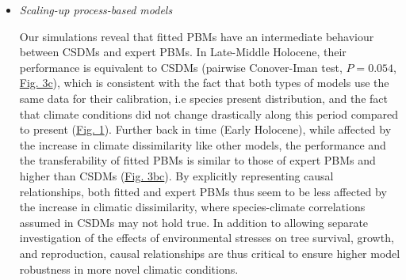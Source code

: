 \documentclass[pdflatex, sn-nature]{sn-jnl}%
\begin{document}
\begin{itemize}
\item \emph{Scaling-up process-based models}\par
Our simulations reveal that fitted PBMs have an intermediate behaviour between CSDMs and expert PBMs. In Late-Middle Holocene, their performance is equivalent to CSDMs (pairwise Conover-Iman test, $P=0.054$, \hyperref[past_performance]{Fig. 3c}), which is consistent with the fact that both types of models use the same data for their calibration, i.e species present distribution, and the fact that climate conditions did not change drastically along this period compared to present (\hyperref[climatic_dissimilarity]{Fig. 1}). Further back in time (Early Holocene), while affected by the increase in climate dissimilarity like other models, the performance and the transferability of fitted PBMs is similar to those of expert PBMs and higher than CSDMs (\hyperref[past_performance]{Fig. 3bc}). By explicitly representing causal relationships, both fitted and expert PBMs thus seem to be less affected by the increase in climatic dissimilarity, where species-climate correlations assumed in CSDMs may not hold true.  In addition to allowing separate investigation of the effects of environmental stresses on tree survival, growth, and reproduction, causal relationships are thus critical to ensure higher model robustness in more novel climatic conditions. 

\end{itemize}
\end{document}

